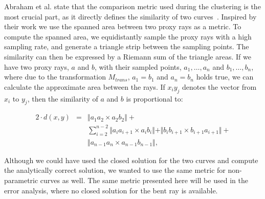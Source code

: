 \documentclass[journal]{vgtc}                %
\begin{document}
Abraham et al. state that the comparison metric used during the clustering is the most crucial part, as it directly defines the similarity of two curves~\cite{abraham03clustering}. Inspired by their work we use the spanned area between two proxy rays as a metric. To compute the spanned area, we equidistantly sample the proxy rays with a high sampling rate, and generate a triangle strip between the sampling points. The similarity can then be expressed by a Riemann sum of the triangle areas. If we have two proxy rays, $a$ and $b$, with their sampled points, $a_1,\dots,a_n$ and $b_1,\dots,b_n$, where due to the transformation $M_{trans}$, $a_1=b_1$ and $a_n=b_n$ holds true, we can calculate the approximate area between the rays. If $x_iy_j$ denotes the vector from $x_i$ to $y_j$, then the similarity of $a$ and $b$ is proportional to:

\begin{eqnarray*}
2\cdot d(x,y) &=& \Vert a_1a_2 \times a_2b_2\Vert + \\
&& \sum_{i=2}^{n-2}\Vert a_ia_{i+1} \times a_ib_i \Vert + \Vert b_ib_{i+1} \times b_{i+1}a_{i+1}\Vert + \\
&& \Vert a_{n-1}a_n \times a_{n-1}b_{n-1}\Vert,
\end{eqnarray*}

Although we could have used the closed solution for the two curves and compute the analytically correct solution, we wanted to use the same metric for non-parametric curves as well. The same metric presented here will be used in the error analysis, where no closed solution for the bent ray is available.
\end{document}
